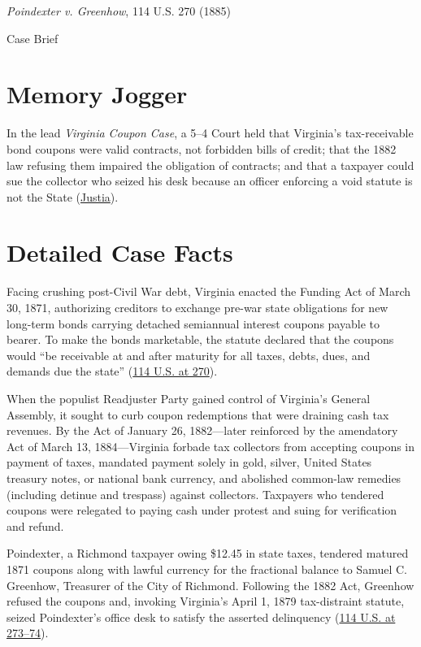\documentclass[12pt]{article}
\begin{document}
\begin{center}
{\LARGE \textit{Poindexter v. Greenhow}, 114 U.S. 270 (1885)\par}
\vspace{0.8em}
{\large Case Brief\par}
\end{center}
\vspace{1em}

\section{Memory Jogger}
In the lead \textit{Virginia Coupon Case}, a 5--4 Court held that Virginia's tax-receivable bond coupons were valid contracts, not forbidden bills of credit; that the 1882 law refusing them impaired the obligation of contracts; and that a taxpayer could sue the collector who seized his desk because an officer enforcing a void statute is not the State (\href{https://supreme.justia.com/cases/federal/us/114/270/}{Justia}).

\section{Detailed Case Facts}
Facing crushing post-Civil War debt, Virginia enacted the Funding Act of March 30, 1871, authorizing creditors to exchange pre-war state obligations for new long-term bonds carrying detached semiannual interest coupons payable to bearer. To make the bonds marketable, the statute declared that the coupons would ``be receivable at and after maturity for all taxes, debts, dues, and demands due the state'' (\href{https://supreme.justia.com/cases/federal/us/114/270/}{114 U.S. at 270}).

When the populist Readjuster Party gained control of Virginia's General Assembly, it sought to curb coupon redemptions that were draining cash tax revenues. By the Act of January 26, 1882---later reinforced by the amendatory Act of March 13, 1884---Virginia forbade tax collectors from accepting coupons in payment of taxes, mandated payment solely in gold, silver, United States treasury notes, or national bank currency, and abolished common-law remedies (including detinue and trespass) against collectors. Taxpayers who tendered coupons were relegated to paying cash under protest and suing for verification and refund.

Poindexter, a Richmond taxpayer owing \$12.45 in state taxes, tendered matured 1871 coupons along with lawful currency for the fractional balance to Samuel C. Greenhow, Treasurer of the City of Richmond. Following the 1882 Act, Greenhow refused the coupons and, invoking Virginia's April 1, 1879 tax-distraint statute, seized Poindexter's office desk to satisfy the asserted delinquency (\href{https://www.law.cornell.edu/supremecourt/text/114/270}{114 U.S. at 273--74}).
\end{document}
